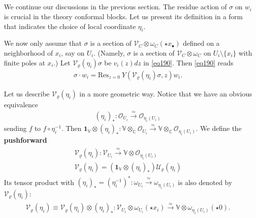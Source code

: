 \documentclass[12pt,a4paper,notitlepage]{article}
\theoremstyle{definition}
\theoremstyle{plain}
\newcommand{\mc}{\mathcal}
\newcommand{\id}{\mathbf{1}}
\newcommand{\Res}{\mathrm{Res}}
\newcommand{\scr}{\mathscr}
\newcommand{\blt}{\bullet}
\newcommand{\Vbb}{\mathbb V}
\newcommand{\Cbb}{\mathbb C}
\numberwithin{equation}{section}
\begin{document}
\subsection{}\label{lb105}


We continue our discussions in the previous section. The residue action of $\sigma$ on $w_i$ is crucial in the theory conformal blocks. Let us present its definition in a form that indicates the choice of local coordinate $\eta_i$.



We now only assume that $\sigma$ is a section of $\scr V_C\otimes\omega_C(\star x_\blt)$ defined on a neighborhood of $x_i$, say on $U_i$. (Namely, $\sigma$ is a section of $\scr V_C\otimes\omega_C$ on $U_i\setminus\{x_i\}$ with finite poles at $x_i$.) Let $\mc V_\varrho(\eta_i)\sigma$ be $v_i(z)dz$ in \eqref{eq190}. Then \eqref{eq190} reads
\begin{gather}
\sigma\cdot w_i=\Res_{z=0} ~Y(\mc V_\varrho(\eta_i)\sigma,z)w_i. \label{eq193}
\end{gather}

Let us  describe $\mc V_\varrho(\eta_i)$ in a more geometric way. Notice that we
have an obvious equivalence
\begin{align*}
(\eta_i)_*:\scr O_{U_i}\xrightarrow{\simeq}\scr O_{\eta_i(U_i)}
\end{align*}
sending $f$ to $f\circ\eta_i^{-1}$. Then $\id_\Vbb\otimes(\eta_i)_*:\Vbb\otimes_\Cbb\scr O_{U_i}\xrightarrow{\simeq}\Vbb\otimes_\Cbb\scr O_{\eta_i(U_i)}$. We define the \textbf{pushforward} \index{V@$\mc V_\varrho(\eta_i),\mc V_\varrho(\varphi)$}
\begin{gather}\label{eq218}
\begin{gathered}
\mc V_\varrho(\eta_i):\scr V_{U_i}\xrightarrow{\simeq}\Vbb\otimes\scr O_{\eta_i(U_i)}\\
\mc V_\varrho(\eta_i)=(\id_\Vbb\otimes(\eta_i)_*)\mc U_\varrho(\eta_i)
\end{gathered}
\end{gather}
Its tensor product with $(\eta_i)_*=(\eta_i^{-1})^*:\omega_{U_i}\xrightarrow{\simeq}\omega_{\eta_i(U_i)}$ is also denoted by $\mc V_\varrho(\eta_i)$:
\begin{gather}
\begin{gathered}
\mc V_\varrho(\eta_i)\equiv \mc V_\varrho(\eta_i)\otimes(\eta_i)_*:\scr V_{U_i}\otimes\omega_{U_i}(\star x_i)\xrightarrow{\simeq}\Vbb\otimes\omega_{\eta_i(U_i)}(\star 0).
\end{gathered}
\end{gather}
\end{document}
